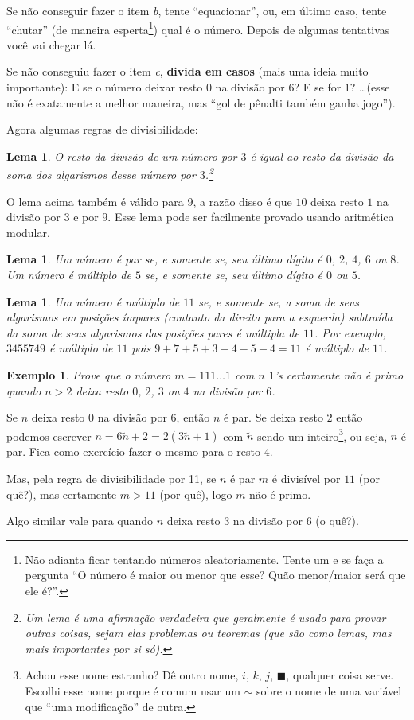 \documentclass{article}
\newcommand{\q}[1]{``#1''}
\newtheorem{lemma}[theorem]{Lema}
\newtheorem{example}[theorem]{Exemplo}
\newenvironment{solution}
  {\renewcommand{\proofname}{Solução}\proof}
  {\endproof}
\begin{document}
Se não conseguir fazer o item \textit{b}, tente \q{equacionar}, ou, em último caso, tente \q{chutar} (de maneira esperta\footnote{Não adianta ficar tentando números aleatoriamente. Tente um e se faça a pergunta \q{O número é maior ou menor que esse? Quão menor/maior será que ele é?}.}) qual é o número. Depois de algumas tentativas você vai chegar lá.

Se não conseguiu fazer o item \textit{c}, \textbf{divida em casos} (mais uma ideia muito importante): E se o número deixar resto $0$ na divisão por $6$? E se for $1$? \dots (esse não é exatamente a melhor maneira, mas \q{gol de pênalti também ganha jogo}).

Agora algumas regras de divisibilidade:

\begin{lemma}
  O resto da divisão de um número por $3$ é igual ao resto da divisão da soma dos algarismos desse número por $3$.\footnote{Um lema é uma afirmação verdadeira que geralmente é usado para \textit{provar} outras coisas, sejam elas problemas ou teoremas (que são como lemas, mas mais importantes por si só).}
\end{lemma}

O lema acima também é válido para $9$, a razão disso é que $10$ deixa resto $1$ na divisão por $3$ e por $9$. Esse lema pode ser facilmente provado usando aritmética modular.

\begin{lemma}
  Um número é par se, e somente se, seu último dígito é $0$, $2$, $4$, $6$ ou $8$. Um número é múltiplo de $5$ se, e somente se, seu último dígito é $0$ ou $5$.
\end{lemma}

\begin{lemma}
  Um número é múltiplo de $11$ se, e somente se, a soma de seus algarismos em posições ímpares (contanto da direita para a esquerda) subtraída da soma de seus algarismos das posições pares é múltipla de $11$. Por exemplo, $3455749$ é múltiplo de $11$ pois $9+7+5+3-4-5-4=11$ é múltiplo de $11$.
\end{lemma}

\begin{example}
  Prove que o número $m = 111\dots1$ com $n$ $1$'s certamente não é primo quando $n > 2$ deixa resto $0$, $2$, $3$ ou $4$ na divisão por $6$.
\end{example}
\begin{solution}
  Se $n$ deixa resto $0$ na divisão por $6$, então $n$ é par. Se deixa resto $2$ então podemos escrever $n = 6 \tilde{n} + 2 = 2 (3 \tilde{n} + 1)$ com $\tilde{n}$ sendo um inteiro\footnote{Achou esse nome estranho? Dê outro nome, $i$, $k$, $j$, $\blacksquare$, qualquer coisa serve. Escolhi esse nome porque é comum usar um $\sim$ sobre o nome de uma variável que \q{uma modificação} de outra.}, ou seja, $n$ é par. Fica como exercício fazer o mesmo para o resto $4$.

  Mas, pela regra de divisibilidade por 11, se $n$ é par $m$ é divisível por $11$ (por quê?), mas certamente $m > 11$ (por quê), logo $m$ não é primo.

  Algo similar vale para quando $n$ deixa resto $3$ na divisão por $6$ (o quê?).
\end{solution}
\end{document}
